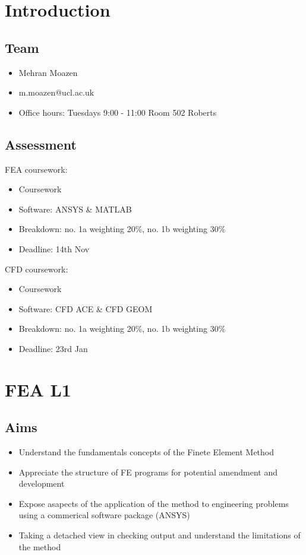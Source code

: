 \documentclass[class=report, crop=false, 12pt,a4paper]{standalone}
\begin{document}
\section{Introduction}
\subsection{Team}
\begin{itemize}
	\item Mehran Moazen
	\item m.moazen@ucl.ac.uk
	\item Office hours: Tuesdays 9:00 - 11:00 Room 502 Roberts
\end{itemize}
\subsection{Assessment}
FEA coursework:
\begin{itemize}
	\item Coursework
	\item Software: ANSYS \& MATLAB
	\item Breakdown: no. 1a weighting 20\%, no. 1b weighting 30\%
	\item Deadline: 14th Nov
\end{itemize}
CFD coursework:
\begin{itemize}
	\item Coursework
	\item Software: CFD ACE \& CFD GEOM
	\item Breakdown: no. 1a weighting 20\%, no. 1b weighting 30\%
	\item Deadline: 23rd Jan
\end{itemize}
\section{FEA L1}
\subsection{Aims}
\begin{itemize}
	\item Understand the fundamentals concepts of the Finete Element Method
	\item Appreciate the structure of FE programs for potential amendment and development
	\item Expose asapects of the application of the method to engineering problems using a commerical software package (ANSYS)
	\item Taking a detached view in checking output and understand the limitations of the method
\end{itemize}
\end{document}
